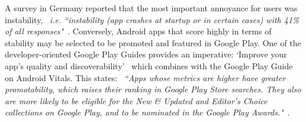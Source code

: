 A survey in Germany reported that the most important annoyance for users was instability, ~\emph{i.e. ``instability (app crashes at startup or in certain cases) with 41\% of all responses"}~.  %
%
Conversely, Android apps that score highly in terms of stability may be selected to be promoted and featured in Google Play. One of the developer-oriented Google Play Guides provides an imperative: `Improve your app’s quality and discoverability'~ which combines with the Google Play Guide on Android Vitals. This states: ~\emph{``Apps whose metrics are higher have greater promotability, which raises their ranking in Google Play Store searches. They also are more likely to be eligible for the New \& Updated and Editor's Choice collections on Google Play, and to be nominated in the Google Play Awards."}~. %

